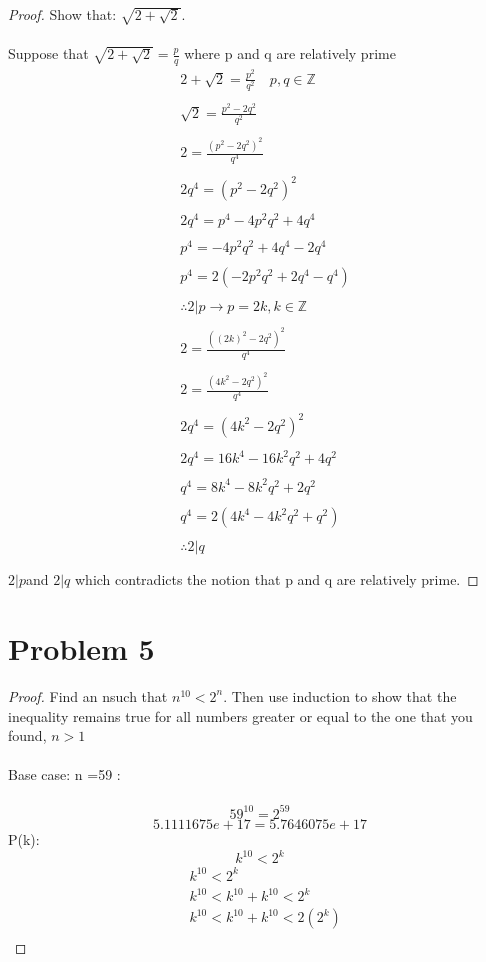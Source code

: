 \documentclass[12pt]{article}
\newcommand{\sect}[1]{\section*{#1}}
\newcommand{\Z}{\mathbb{Z}}
\theoremstyle{definition}
\theoremstyle{remark}
\numberwithin{equation}{section}
\begin{document}
\begin{proof}
  Show that: $\sqrt{2+\sqrt{2}}$. \\\\
  Suppose that  $\sqrt{2+\sqrt{2}}=\frac{p}{q}$ where p and q are relatively prime\\

  \begin{align*}
    &2+\sqrt{2}=\frac{p^2}{q^2}\quad p,q\in \Z\\\\
    &\sqrt{2}=\frac{p^2-2q^2}{q^2}\\\\
    &2=\frac{(p^2-2q^2)^2}{q^4}\\\\
    &2q^4=(p^2-2q^2)^2\\\\
    &2q^4=p^4-4p^2q^2+4q^4\\\\
    &p^4=-4p^2q^2+4q^4-2q^4\\\\
    &p^4=2(-2p^2q^2+2q^4-q^4)\\\\
    &\therefore 2|p\rightarrow p=2k, k \in \Z\\\\
    &2=\frac{((2k)^2-2q^2)^2}{q^4}\\\\
    &2=\frac{(4k^2-2q^2)^2}{q^4}\\\\
    &2q^4=(4k^2-2q^2)^2\\\\
    &2q^4=16k^4-16k^2q^2+4q^2\\\\
    &q^4=8k^4-8k^2q^2+2q^2\\\\
    &q^4=2(4k^4-4k^2q^2+q^2)\\\\
    &\therefore 2|q\\\\
  \end{align*}
  $2|p$and $2|q$ which contradicts the notion that p and q are relatively prime.
\end{proof}
\sect{Problem 5}
\begin{proof}
  Find an nsuch that $n^10 <2^n$. Then use induction to show that the inequality remains
true for all numbers greater or equal to the one that you found, $n>1$\\\\
Base case: n =59 : \\\\
\[
  59^{10}=2^{59}
\]
\[
   5.1111675e+17=5.7646075e+17
\]
P(k):\\
\[
  k^{10}<2^k
\]
\begin{align*}
  &k^{10}<2^k\\
  &k^{10}<k^{10}+k^{10}<2^k\\
  &k^{10}<k^{10}+k^{10}<2(2^k)\\

\end{align*}
\end{proof}
\end{document}
